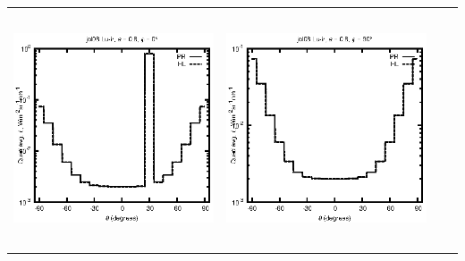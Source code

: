 \begin{tabular}{c c c c}
\includegraphics[height=7cm]{../eps/jol08_Lu_ir_fwd.eps} &
\includegraphics[height=7cm]{../eps/jol08_Lu_ir_cross.eps} \\
\end{tabular}

\pagebreak


